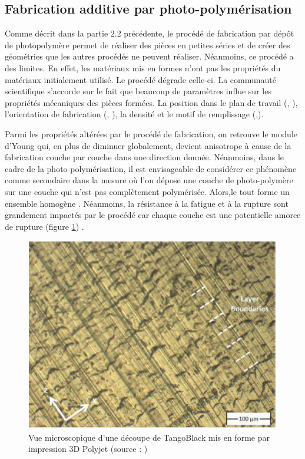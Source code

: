 \documentclass[10pt, a4paper]{article}
\begin{document}
    \subsection{Fabrication additive par photo-polymérisation}
    
    \qquad Comme décrit dans la partie 2.2 précédente, le procédé de fabrication par dépôt de photopolymère permet de réaliser des pièces en petites séries et de créer des géométries que les autres procédés ne peuvent réaliser. Néanmoins, ce procédé a des limites. En effet, les matériaux mis en formes n'ont pas les propriétés du matériaux initialement utilisé. Le procédé dégrade celle-ci. La communauté scientifique s'accorde sur le fait que beaucoup de paramètres influe sur les propriétés mécaniques des pièces formées. La position dans le plan de travail (\cite{Herdiana2013}, \cite{Gay2015}), l'orientation de fabrication (\cite{Beltran2015}, \cite{Gay2015}), la densité et le motif de remplissage (\cite{Barnik2019},\cite{Yang2019}). \newline\newline
    
    \quad  Parmi les propriétés altérées par le procédé de fabrication, on retrouve le module d'Young qui, en plus de diminuer globalement, devient anisotrope à cause de la fabrication couche par couche dans une direction donnée. Néanmoins, dans le cadre de la photo-polymérisation, il est envisageable de considérer ce phénomène comme secondaire dans la mesure où l'on dépose une couche de photo-polymère sur une couche qui n'est pas complètement polymérisée. Alors,le tout forme un ensemble  homogène \cite{Herdiana2013}. Néanmoins, la résistance à la fatigue et à la rupture sont grandement impactés par le procédé car chaque couche est une potentielle amorce de rupture (figure \ref{fig:coupeTango}) \cite{Barnik2019}. \\
    
\begin{figure}[ht!]
\centering
\includegraphics[scale=0.65]{ImageIntro/coupePolyjet.PNG}
\caption{ Vue microscopique d'une découpe de TangoBlack mis en forme par impression 3D Polyjet (source : \cite{Moore2015}) }
\label{fig:coupeTango}
\end{figure}
    
\end{document}
